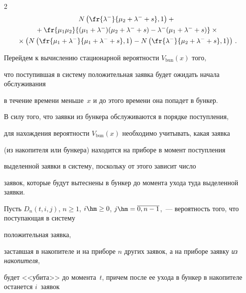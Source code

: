 \begin{multicols}{2}
\begin{multline*}
N \left (


\fr{ \lambda^- }{\mu_2+\lambda^- + s},1\right )


+{}


\\


{}+


\fr{\mu_1 \mu_2 }{(\mu_1+\lambda^-) (\mu_2+\lambda^- + s) - \lambda^- (\mu_1+\lambda^- + s)}


\times{}


\\


{}\times


\left ( N\left ( \fr{ \mu_1 + \lambda^- }{ \mu_1+\lambda^- + s},


1 \right ) - N \left ( \fr{ \lambda^- }{ \mu_2+\lambda^- + s},


1 \right ) \right )\,.


\end{multline*}





Перейдем к вычислению стационарной вероятности $V_{\mathrm{bun}}(x)$ того,


что поступившая в систему положительная заявка будет ожидать начала обслуживания


в течение времени меньше~$x$ и до этого времени она попадет в бункер.





В силу того, что заявки из бункера обслуживаются в порядке поступления,


для нахождения вероятности $V_{\mathrm{bun}}(x)$ необходимо учитывать, какая заявка


(из накопителя или бункера) находится на приборе в момент поступления


выделенной заявки в систему, поскольку от этого зависит число


заявок, которые будут вытеснены в бункер до момента ухода туда выделенной заявки.





Пусть $D_n(t,i,j)$,  $n\ge 1$,  $i \hm\ge 0$,  $j\hm=\overline{0,n-1}$,~--- вероятность того, что поступающая в систему 


положительная заявка,


заставшая в накопителе и на приборе $n$ других заявок, а на приборе заявку \textit{из накопителя},


будет <<убита>> до момента~$t$, причем после ее ухода в бункер в накопителе останется $i$~заявок



\end{multicols}
